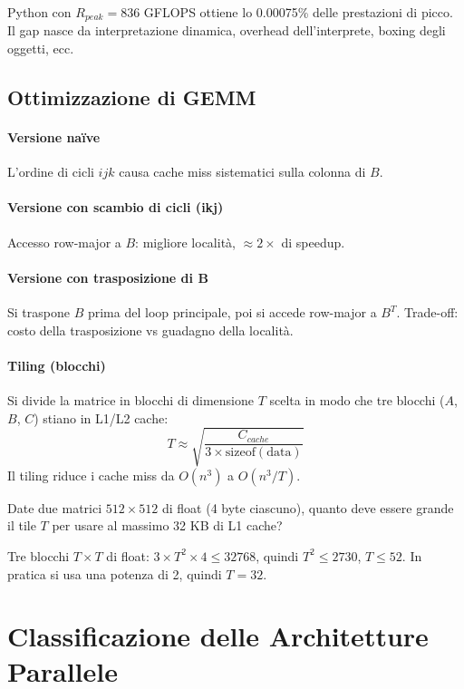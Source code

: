 \documentclass[11pt,a4paper]{article}
\theoremstyle{remark}
\newenvironment{esercizio}[1][]{%
  \begin{tcolorbox}[breakable,title={\textbf{Esercizio / Domanda d'esame}\ifx&#1&\else: #1\fi},
    colback=yellow!5!white, colframe=orange!75!black, fonttitle=\small\bfseries]%
}{%
  \end{tcolorbox}%
}
\newenvironment{risposta}{%
  \begin{tcolorbox}[breakable,title={\textbf{Risposta}},
    colback=green!5!white, colframe=green!50!black, fonttitle=\small\bfseries]%
}{%
  \end{tcolorbox}%
}
\begin{document}
Python con $R_{peak} = 836$ GFLOPS ottiene lo 0.00075\% delle prestazioni di picco. Il gap nasce da interpretazione dinamica, overhead dell'interprete, boxing degli oggetti, ecc.

\subsection{Ottimizzazione di GEMM}

\paragraph{Versione naïve} L'ordine di cicli $ijk$ causa cache miss sistematici sulla colonna di $B$.

\paragraph{Versione con scambio di cicli (ikj)} Accesso row-major a $B$: migliore località, $\approx 2\times$ di speedup.

\paragraph{Versione con trasposizione di B} Si traspone $B$ prima del loop principale, poi si accede row-major a $B^T$. Trade-off: costo della trasposizione vs guadagno della località.

\paragraph{Tiling (blocchi)} Si divide la matrice in blocchi di dimensione $T$ scelta in modo che tre blocchi ($A$, $B$, $C$) stiano in L1/L2 cache:
\[
  T \approx \sqrt{\frac{C_{cache}}{3 \times \text{sizeof}(\text{data})}}
\]
Il tiling riduce i cache miss da $O(n^3)$ a $O(n^3 / T)$.

\begin{esercizio}
Date due matrici $512 \times 512$ di float (4 byte ciascuno), quanto deve essere grande il tile $T$ per usare al massimo 32 KB di L1 cache?
\end{esercizio}
\begin{risposta}
  Tre blocchi $T \times T$ di float: $3 \times T^2 \times 4 \leq 32768$, quindi $T^2 \leq 2730$, $T \leq 52$. In pratica si usa una potenza di 2, quindi $T=32$.
\end{risposta}

\section{Classificazione delle Architetture Parallele}
\end{document}

